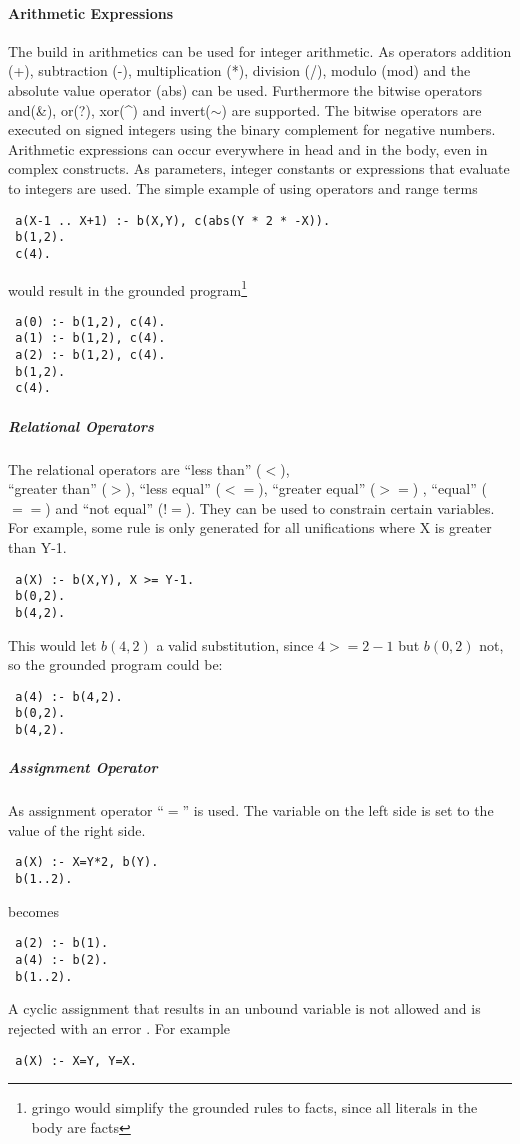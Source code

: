 \documentclass[a4paper,10pt]{article}
\begin{document}
\paragraph{Arithmetic Expressions}
The build in arithmetics can be used for integer arithmetic.
As operators addition (+), subtraction (-), multiplication (*), division (/), modulo (mod) and the absolute value operator (abs) can be used.
Furthermore the bitwise operators and(\&), or(?), xor(\textasciicircum) and invert($\sim$) are supported. The bitwise operators are executed on signed integers using the binary complement for negative numbers.
Arithmetic expressions can occur everywhere in head and in the body, even in complex constructs.
As parameters, integer constants or expressions that evaluate to integers are used.
The simple example of using operators and range terms
\begin{verbatim}
 a(X-1 .. X+1) :- b(X,Y), c(abs(Y * 2 * -X)).
 b(1,2).
 c(4).
\end{verbatim}
would result in the grounded program\footnote{gringo would simplify the grounded rules to facts, since all literals in the body are facts}
\begin{verbatim}
 a(0) :- b(1,2), c(4).
 a(1) :- b(1,2), c(4).
 a(2) :- b(1,2), c(4).
 b(1,2).
 c(4).
\end{verbatim}

\subparagraph{Relational Operators}
The relational operators are ``less than'' ($<$),\\ ``greater than'' ($>$), ``less equal'' ($<=$), ``greater equal'' ($>=$) , ``equal'' ($==$) and ``not equal'' ($!=$).
They can be used to constrain certain variables.
For example, some rule is only generated for all unifications where X is greater than Y-1.
\begin{verbatim}
 a(X) :- b(X,Y), X >= Y-1.
 b(0,2).
 b(4,2).
\end{verbatim}
This would let $b(4,2)$ a valid substitution, since $4 >= 2-1$ but $b(0,2)$ not, so the grounded program could be:
\begin{verbatim}
 a(4) :- b(4,2).
 b(0,2).
 b(4,2).
\end{verbatim}

\subparagraph{Assignment Operator}
As assignment operator ``$=$'' is used.
The variable on the left side is set to the value of the right side.
\begin{verbatim}
 a(X) :- X=Y*2, b(Y).
 b(1..2).
\end{verbatim}
becomes
\begin{verbatim}
 a(2) :- b(1).
 a(4) :- b(2).
 b(1..2).
\end{verbatim}
A cyclic assignment that results in an unbound variable is not allowed and is rejected with an error . For example
\begin{verbatim}
 a(X) :- X=Y, Y=X.
\end{verbatim}
\end{document}
